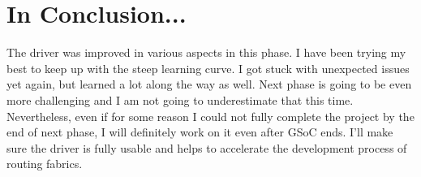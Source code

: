 \documentclass{article}
\begin{document}
\section{In Conclusion...}
The driver was improved in various aspects in this phase. I have been trying my
best to keep up with the steep learning curve. I got stuck with unexpected issues
yet again, but learned a lot along the way as well. Next phase is going to
be even more challenging and I am not going to underestimate that this time.
Nevertheless, even if for some reason I could not fully complete the project by
the end of next phase, I will definitely work on it even after GSoC ends. I'll
make sure the driver is fully usable and helps to accelerate the development process
of routing fabrics.
\end{document}
